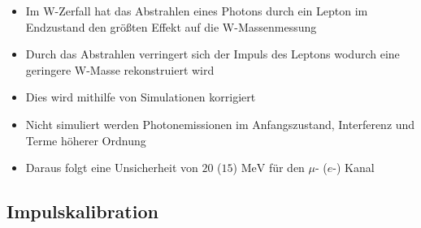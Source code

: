 \documentclass[aspectratio=1610, 9pt]{beamer}
\begin{document}
\begin{frame}
  \begin{itemize}
    \item Im W-Zerfall hat das Abstrahlen eines Photons durch ein Lepton im Endzustand den größten Effekt auf die W-Massenmessung
    \item Durch das Abstrahlen verringert sich der Impuls des Leptons wodurch eine geringere W-Masse rekonstruiert wird
    \item Dies wird mithilfe von Simulationen korrigiert
    \item Nicht simuliert werden Photonemissionen im Anfangszustand, Interferenz und Terme höherer Ordnung
    \item[\rightarrow] Daraus folgt eine Unsicherheit von $\num{20}$ ($\num{15}$) $\si{\MeV}$ für den $\mu$- ($e$-) Kanal

  \end{itemize}
\end{frame}

\subsection{Impulskalibration}
\end{document}
